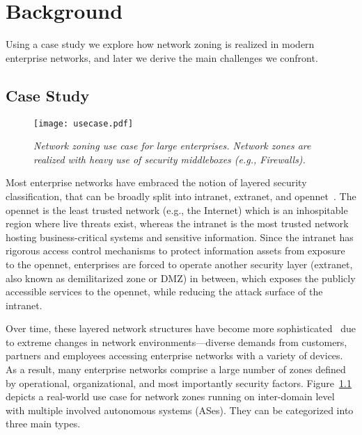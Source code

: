\chapter{Background}
\label{background}

Using a case study we explore how network zoning is realized in modern enterprise networks, and later we derive the main challenges we confront.

\section{Case Study}
\label{sec:casestudy}

\begin{figure}[htb]
	\begin{center}
		\texttt{[image: usecase.pdf]}
	\end{center}
	\caption{\textit{Network zoning use case for large enterprises. Network zones are
			realized with heavy use of security middleboxes (e.g., Firewalls).}}
	\label{fig:usecase}
\end{figure}

Most enterprise networks have embraced the notion of layered security classification,
that can be broadly split into intranet, extranet, and opennet~\cite{ramasamy2011towards}.
The opennet is the least trusted network (e.g., the Internet) which is an inhospitable region
where live threats exist, whereas the intranet is the most trusted network hosting
business-critical systems and sensitive information. Since the intranet has rigorous access
control mechanisms to protect information assets from exposure to the opennet, enterprises are
forced to operate another security layer (extranet, also known as demilitarized zone or DMZ) in between,
which exposes the publicly accessible services to the opennet, while reducing the attack surface of the intranet.

Over time, these layered network structures have become more sophisticated~\cite{obregon2015infrastructure}
due to extreme changes in network environments---diverse demands from customers, partners
and employees accessing enterprise networks with a variety of devices.
As a result, many enterprise networks
comprise a large number of zones defined by operational, organizational, and most
importantly security factors. Figure~\ref{fig:usecase} depicts a real-world use case for
network zones running on inter-domain level with multiple involved autonomous systems (ASes). They
can be categorized into three main types.

